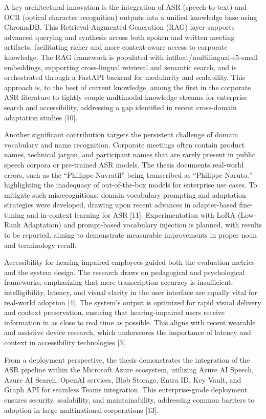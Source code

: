 \documentclass[12pt,a4paper]{article}
\begin{document}
A key architectural innovation is the integration of ASR (speech-to-text) and OCR (optical character recognition) outputs into a unified knowledge base using ChromaDB. This Retrieval-Augmented Generation (RAG) layer supports advanced querying and synthesis across both spoken and written meeting artifacts, facilitating richer and more context-aware access to corporate knowledge. The RAG framework is populated with intfloat/multilingual-e5-small embeddings, supporting cross-lingual retrieval and semantic search, and is orchestrated through a FastAPI backend for modularity and scalability. This approach is, to the best of current knowledge, among the first in the corporate ASR literature to tightly couple multimodal knowledge streams for enterprise search and accessibility, addressing a gap identified in recent cross-domain adaptation studies [10].


Another significant contribution targets the persistent challenge of domain vocabulary and name recognition. Corporate meetings often contain product names, technical jargon, and participant names that are rarely present in public speech corpora or pre-trained ASR models. The thesis documents real-world errors, such as the “Philippe Navratil” being transcribed as “Philippe Naruto,” highlighting the inadequacy of out-of-the-box models for enterprise use cases. To mitigate such misrecognitions, domain vocabulary prompting and adaptation strategies were developed, drawing upon recent advances in adapter-based fine-tuning and in-context learning for ASR [11]. Experimentation with LoRA (Low-Rank Adaptation) and prompt-based vocabulary injection is planned, with results to be reported, aiming to demonstrate measurable improvements in proper noun and terminology recall.


Accessibility for hearing-impaired employees guided both the evaluation metrics and the system design. The research draws on pedagogical and psychological frameworks, emphasizing that mere transcription accuracy is insufficient; intelligibility, latency, and visual clarity in the user interface are equally vital for real-world adoption [4]. The system’s output is optimized for rapid visual delivery and context preservation, ensuring that hearing-impaired users receive information in as close to real time as possible. This aligns with recent wearable and assistive device research, which underscores the importance of latency and context in accessibility technologies [3].


From a deployment perspective, the thesis demonstrates the integration of the ASR pipeline within the Microsoft Azure ecosystem, utilizing Azure AI Speech, Azure AI Search, OpenAI services, Blob Storage, Entra ID, Key Vault, and Graph API for seamless Teams integration. This enterprise-grade deployment ensures security, scalability, and maintainability, addressing common barriers to adoption in large multinational corporations [13].
\end{document}
